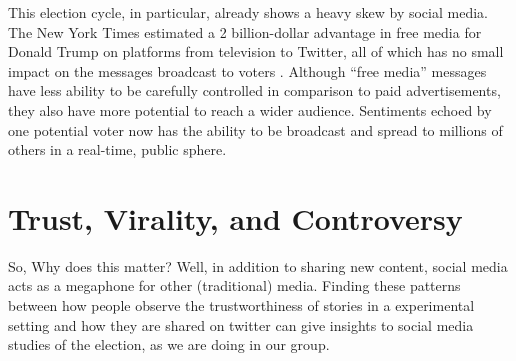 This election cycle, in particular, already shows a heavy skew by social media. The New York Times estimated a 2 billion-dollar advantage in free media for Donald Trump on platforms from television to Twitter, all of which has no small impact on the messages broadcast to voters \cite{nyt-trump-free-media}. Although ``free media'' messages have less ability to be carefully controlled in comparison to paid advertisements, they also have more potential to reach a wider audience. Sentiments echoed by one potential voter now has the ability to be broadcast and spread to millions of others in a real-time, public sphere.
  

 
  


\section{Trust, Virality, and Controversy}

So,
Why does this matter?
Well, in addition to sharing new content, social media acts as a megaphone for other (traditional) media. Finding these patterns between how people observe the trustworthiness of stories in a experimental setting and how they are shared on twitter can give insights to social media studies of the election, as we are doing in our group.


















